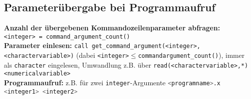 \documentclass[a4paper, twocolumn]{scrarticle}
\begin{document}
\subsection{Parameterübergabe bei Programmaufruf}
\textbf{Anzahl der übergebenen Kommandozeilenparameter abfragen:} \lstinline|<integer> = command_argument_count()|\\
\textbf{Parameter einlesen:} \lstinline|call get_command_argument(<integer>, <charactervariable>)| (dabei \lstinline|<integer>|$\leq$\lstinline|commandargument_count()|), immer als \lstinline|character| eingelesen, Umwandlung z.B. über \lstinline|read(<charactervariable>,*) <numericalvariable>|\\
\textbf{Programmaufruf:} z.B. für zwei \lstinline|integer|-Argumente \lstinline[language=bash]|<programname>.x <integer1> <integer2>|
\end{document}
